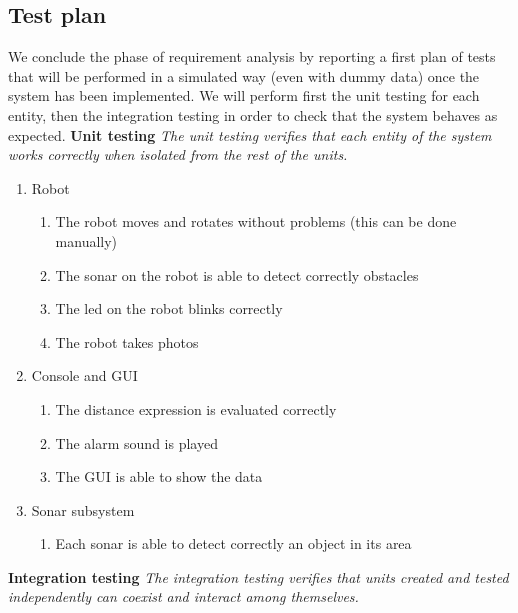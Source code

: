 \documentclass[a4paper]{article}
\begin{document}
\subsection {Test plan}

We conclude the phase of requirement analysis by reporting a first plan of tests that will be performed in a simulated way (even with dummy data) once the system has been implemented. We will perform first the unit testing for each entity, then the integration testing in order to check that the system behaves as expected.\newline\newline
{\large\textbf{Unit testing}}\newline
\textit{The unit testing verifies that each entity of the system works correctly when isolated from the rest of the units.}
\begin{enumerate}
	\item Robot
		\begin{enumerate}
			\item The robot moves and rotates without problems (this can be done manually)
			\item The sonar on the robot is able to detect correctly obstacles
			\item The led on the robot blinks correctly
			\item The robot takes photos
		\end{enumerate}
	\item Console and GUI
		\begin{enumerate}
			\item The distance expression is evaluated correctly
			\item The alarm sound is played
			\item The GUI is able to show the data
		\end{enumerate}
	\item Sonar subsystem
		\begin{enumerate}
			\item Each sonar is able to detect correctly an object in its area
		\end{enumerate}
\end{enumerate}\hfill\break
{\large\textbf{Integration testing}}\newline
\textit{The integration testing verifies that units created and tested independently can coexist and interact among themselves.}
\end{document}
